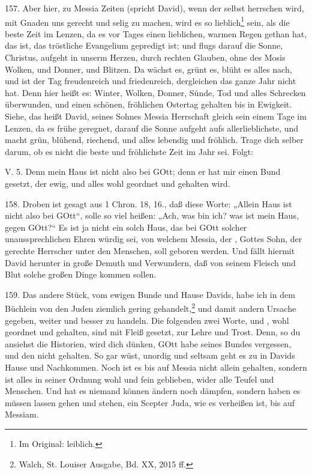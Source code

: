 157. Aber hier, zu Messia Zeiten (spricht David), wenn der  selbst herrschen wird, mit Gnaden uns gerecht und selig zu machen, wird es so lieblich\footnote{Im Original: leiblich.} sein, als die beste Zeit im Lenzen, da es vor Tages einen lieblichen, warmen Regen gethan hat, das ist, das tröstliche Evangelium gepredigt ist; und flugs darauf die Sonne, Christus, aufgeht in unserm Herzen, durch rechten Glauben, ohne des Mosis Wolken, und Donner, und Blitzen. Da wächst es, grünt es, blüht es alles nach, und ist der Tag freudenreich und friedenreich, dergleichen das ganze Jahr nicht hat. Denn hier heißt es: Winter, Wolken, Donner, Sünde, Tod und alles Schrecken überwunden, und einen schönen, fröhlichen Ostertag gehalten bis in Ewigkeit. Siehe, das heißt David, seines Sohnes Messia Herrschaft gleich sein einem Tage im Lenzen, da es frühe geregnet, darauf die Sonne aufgeht aufs allerlieblichste, und macht grün, blühend,
riechend, und alles lebendig und fröhlich. Trage dich selber darum, ob es nicht die beste und fröhlichste Zeit im Jahr sei. Folgt:

\begin{schriftzitat}
V. 5. Denn mein Haus ist nicht also bei GOtt; denn er hat mir einen Bund gesetzt, der ewig, und alles wohl geordnet und gehalten wird.
\end{schriftzitat}

158. Droben ist gesagt aus 1 Chron. 18, 16., daß diese Worte: „Allein Haus ist nicht also bei GOtt“, solle so viel heißen: „Ach, was bin ich? was ist mein Haus, gegen GOtt?“ Es ist ja nicht ein solch Haus, das bei GOtt solcher unaussprechlichen Ehren würdig sei, von welchem Messia, der , Gottes Sohn, der gerechte Herrscher unter den Menschen, soll geboren werden. Und fällt hiermit David herunter in große Demuth und Verwundern, daß von seinem Fleisch und Blut solche großen Dinge kommen sollen.

159. Das andere Stück, vom ewigen Bunde und Hause Davids, habe ich in dem Büchlein von den Juden ziemlich gering gehandelt,\footnote{Walch, St. Louiser Ausgabe, Bd. XX, 2015 ff.} und damit andern Ursache gegeben, weiter und besser zu handeln. Die folgenden zwei Worte,  und , wohl geordnet und gehalten, sind mit Fleiß gesetzt, zur Lehre und Trost. Denn, so du ansiehst die Historien, wird dich dünken, GOtt habe seines Bundes vergessen, und den nicht gehalten. So gar wüst, unordig und seltsam geht es zu in Davids Hause und Nachkommen. Noch ist es bis auf Messia nicht allein gehalten, sondern ist alles in seiner Ordnung wohl und fein geblieben, wider alle Teufel und Menschen. Und hat es niemand können ändern noch dämpfen, sondern haben es müssen lassen gehen und stehen, ein Scepter Juda, wie es verheißen ist, bis auf Messiam.

